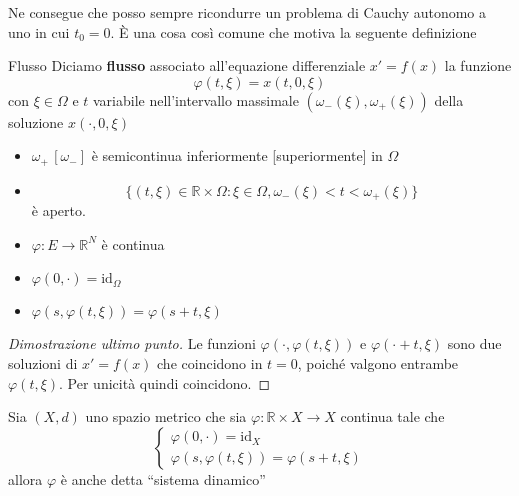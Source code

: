 Ne consegue che posso sempre ricondurre un problema di Cauchy autonomo a uno in
cui \(t_{0} = 0\). È una cosa così comune che motiva la seguente definizione

\begin{definition}{Flusso}
    Diciamo \textbf{flusso} associato all'equazione differenziale \(x' = f
    {(x)}\) la funzione
    \[
        \varphi {(t, \xi)} = x{(t , 0, \xi)}
    \]
    con \(\xi \in \Omega\) e \( t\) variabile nell'intervallo massimale
    \({(\omega_-{(\xi)}, \omega_+{(\xi)})}\) della soluzione \(x{(\cdot , 0, \xi)}\) 
\end{definition}

\begin{proposition}
    \begin{itemize}
    \item \(\omega_+\, [\omega_-]\) è semicontinua inferiormente [superiormente] in
    \(\Omega\)
\item \[
        \{{(t, \xi)} \in \mathbb{R} \times \Omega : \xi \in \Omega,
        \omega_-{(\xi)} < t < \omega_+{(\xi)}\} 
    \]
    è aperto.

\item \(\varphi : E \to \mathbb{R}^{N}\) è continua

\item \(\varphi {(0, \cdot )} = \text{id}_\Omega\) 

\item \(\varphi {(s, \varphi {(t, \xi)})} = \varphi {(s+t, \xi)}\) 
    \end{itemize}
\end{proposition}
    
\begin{proof}[Dimostrazione ultimo punto]
    Le funzioni \(\varphi {(\cdot , \varphi {(t, \xi)})}\)  e \(\varphi {(\cdot
    +t, \xi)}\) sono due soluzioni di \(x'=f{(x)}\) che coincidono in \(t = 0\),
    poiché valgono entrambe \(\varphi {(t, \xi)}\). Per unicità quindi
    coincidono.
\end{proof}

\begin{remark}
    Sia \({(X, d)}\) uno spazio metrico che sia \(\varphi : \mathbb{R} \times X
    \to X\) continua tale che
    \[
        \begin{cases}
            \varphi {(0, \cdot )} = \text{id}_X \\
            \varphi {(s, \varphi {(t, \xi)})} = \varphi {(s+t, \xi)}
        \end{cases}
    \]
    allora \(\varphi \) è anche detta ``sistema dinamico''
\end{remark}

